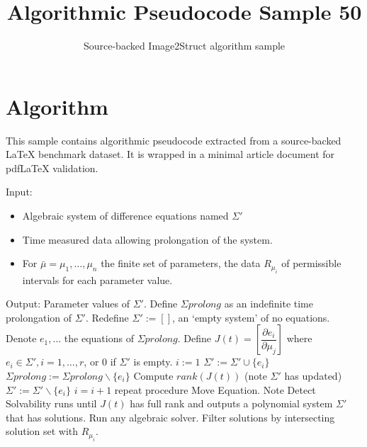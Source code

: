\documentclass[11pt]{article}
\title{Algorithmic Pseudocode Sample 50}
\author{Source-backed Image2Struct algorithm sample}
\date{}
\begin{document}
\maketitle
\section{Algorithm}
This sample contains algorithmic pseudocode extracted from a source-backed LaTeX benchmark dataset. It is wrapped in a minimal article document for pdfLaTeX validation.

\begin{algorithm}[htbp]
\caption{Source-backed algorithmic procedure}
\begin{algorithmic}[1]
\State Input:\begin{itemize}
\item Algebraic system of difference equations named $\Sigma'$
\item Time measured data allowing prolongation of the system.
\item For $\bar{\mu}=\mu_1,\ldots,\mu_n$ the finite set of parameters, the data $R_{\mu_i}$ of permissible intervals for each parameter value.
\end{itemize}
\State Output: Parameter values of $\Sigma'$.
\State Define $\Sigma prolong$ as an indefinite time prolongation of $\Sigma'$.
\State Redefine $\Sigma':=[]$, an `empty system' of no equations.
\State Denote $e_1,\ldots$ the equations of $\Sigma prolong$.
\State Define $J(t)=\left[\dfrac{\partial e_i}{\partial\mu_j}\right]$ where $e_i\in \Sigma',i=1,\ldots,r$, or 0 if $\Sigma'$ is empty.
\State $i:=1$
\State $\Sigma':=\Sigma'\cup\{e_i\}$
\State $\Sigma prolong:=\Sigma prolong\backslash\{e_i\}$
\State Compute $rank(J(t))$ (note $\Sigma'$ has updated)
 $\Sigma':=\Sigma'\backslash\{e_i\}$
\EndIf
\State $i=i+1$
 repeat procedure Move Equation.
\EndIf
\EndProcedure
\EndFor
{} Note Detect Solvability runs until $J(t)$ \phantom{---------}has full rank and outputs a polynomial system $\Sigma'$ that has solutions. Run any \phantom{---------}algebraic solver.
\State Filter solutions by intersecting solution set with $R_{\mu_i}$.
\EndProcedure
\EndProcedure
\end{algorithmic}
\end{algorithm}
\end{document}
